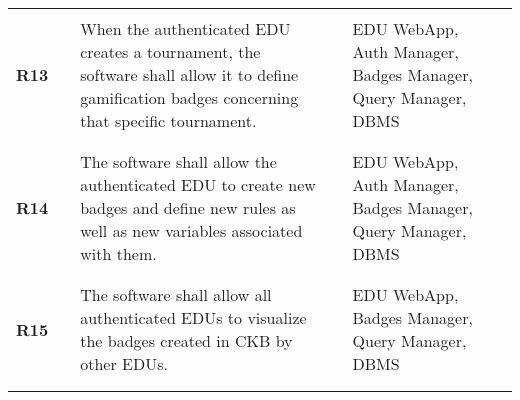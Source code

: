 \begin{longtable}[H]{l l p{6cm} l p{4cm} l}
                            &        &                                                                                                                                                                                                                                                                              &        &       \\\hline  & & \\ 
    \textbf{R13}            & \vline & When the authenticated EDU creates a tournament, the software shall allow it to define gamification badges concerning that specific tournament.                                                                                                                              & \vline &  EDU WebApp, Auth Manager, Badges Manager, Query Manager, DBMS \\          
                            &        &                                                                                                                                                                                                                                                                              &        &       \\\hline  & & \\ 
    \textbf{R14}            & \vline & The software shall allow the authenticated EDU to create new badges and define new rules as well as new variables associated with them.                                                                                                                                      & \vline &  EDU WebApp, Auth Manager, Badges Manager, Query Manager, DBMS \\          
                            &        &                                                                                                                                                                                                                                                                              &        &       \\\hline  & & \\ 
    \textbf{R15}            & \vline & The software shall allow all authenticated EDUs to visualize the badges created in CKB by other EDUs.                                                                                                                                                                        & \vline &  EDU WebApp, Badges Manager, Query Manager, DBMS \\          
                            &        &                                                                                                                                                                                                                                                                              &        &       \\\hline  & & \\ 

\end{longtable}
